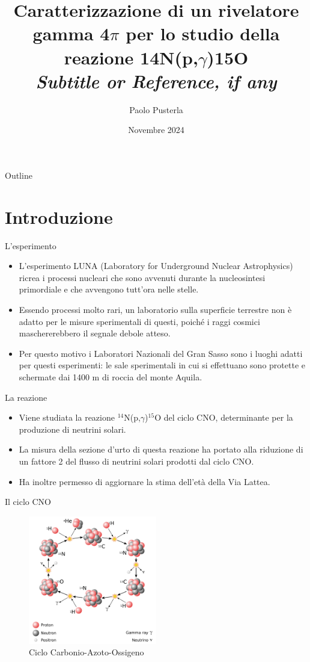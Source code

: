 \documentclass [xcolor=svgnames] {beamer}
\title[Short Title]{Caratterizzazione di un rivelatore gamma 4$\pi$ per lo studio della reazione 14N(p,$\gamma$)15O \\ \textit{Subtitle or Reference, if any}}
\author[P. Pusterla]{Paolo Pusterla}
\institute[UniTo]{Università degli Studi di Torino}
\date{Novembre 2024}
\begin{document}
	
	\begin{frame}
		\titlepage
	\end{frame}
	
	\begin{frame}{Outline}
		\tableofcontents
	\end{frame}
	
	\section{Introduzione}
	\begin{frame}{L'esperimento}
		\begin{itemize}
			\item L'esperimento LUNA (Laboratory for Underground Nuclear Astrophysics) ricrea i processi nucleari che sono avvenuti durante la nucleosintesi primordiale e che avvengono tutt'ora nelle stelle.
			\item Essendo processi molto rari, un laboratorio sulla superficie terrestre non è adatto per le misure sperimentali di questi, poiché i raggi cosmici maschererebbero il segnale debole atteso.
			\item Per questo motivo i Laboratori Nazionali del Gran Sasso sono i luoghi adatti per questi esperimenti: le sale sperimentali in cui si effettuano sono protette e schermate dai 1400 m di roccia del monte Aquila. 
		\end{itemize}
	\end{frame}
	
	\begin{frame}{La reazione}
		\begin{itemize}
			\item Viene studiata la reazione $^{14}$N(p,$\gamma$)$^{15}$O del ciclo CNO, determinante per la produzione di neutrini solari.
			\item La misura della sezione d'urto di questa reazione ha portato alla riduzione di un fattore 2 del flusso di neutrini solari prodotti dal ciclo CNO.
			\item Ha inoltre permesso di aggiornare la stima dell'età della Via Lattea.
		\end{itemize}
	\end{frame}

	\begin{frame}{Il ciclo CNO}
		\begin{figure}[H]
			\includegraphics[width=0.5\textwidth]{img/CNO_Cycle.pdf}
			\caption{Ciclo Carbonio-Azoto-Ossigeno}
		\end{figure}
	\end{frame}
\end{document}
